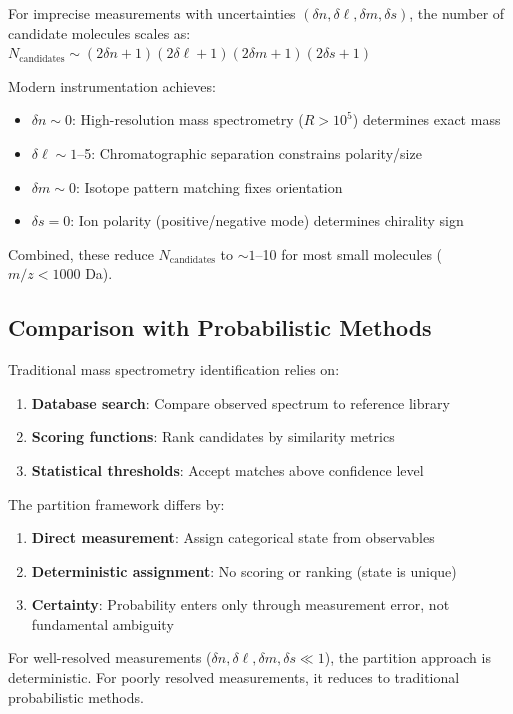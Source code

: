 \documentclass[twocolumn,10pt]{article}
\begin{document}
For imprecise measurements with uncertainties $(\delta n, \delta \ell, \delta m, \delta s)$, the number of candidate molecules scales as:
$
N_{\mathrm{candidates}} \sim (2\delta n + 1)(2\delta \ell + 1)(2\delta m + 1)(2\delta s + 1)
$

Modern instrumentation achieves:
\begin{itemize}
    \item $\delta n \sim 0$: High-resolution mass spectrometry ($R > 10^5$) determines exact mass
    \item $\delta \ell \sim 1$–5: Chromatographic separation constrains polarity/size
    \item $\delta m \sim 0$: Isotope pattern matching fixes orientation
    \item $\delta s = 0$: Ion polarity (positive/negative mode) determines chirality sign
\end{itemize}

Combined, these reduce $N_{\mathrm{candidates}}$ to $\sim 1$–10 for most small molecules ($m/z < 1000$ Da).

\subsection{Comparison with Probabilistic Methods}

Traditional mass spectrometry identification relies on:
\begin{enumerate}
    \item \textbf{Database search}: Compare observed spectrum to reference library
    \item \textbf{Scoring functions}: Rank candidates by similarity metrics
    \item \textbf{Statistical thresholds}: Accept matches above confidence level
\end{enumerate}

The partition framework differs by:
\begin{enumerate}
    \item \textbf{Direct measurement}: Assign categorical state from observables
    \item \textbf{Deterministic assignment}: No scoring or ranking (state is unique)
    \item \textbf{Certainty}: Probability enters only through measurement error, not fundamental ambiguity
\end{enumerate}

For well-resolved measurements ($\delta n, \delta \ell, \delta m, \delta s \ll 1$), the partition approach is deterministic. For poorly resolved measurements, it reduces to traditional probabilistic methods.
\end{document}
